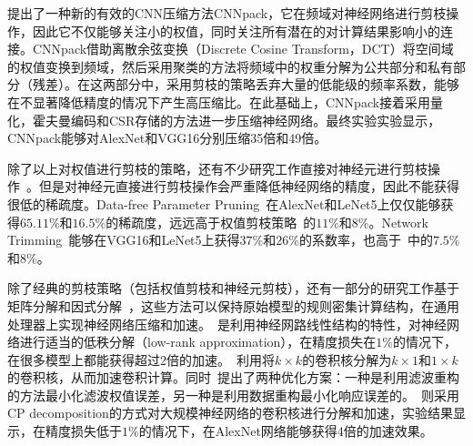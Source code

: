 \citet{wang2016cnnpack}提出了一种新的有效的CNN压缩方法CNNpack，它在频域对神经网络进行剪枝操作，因此它不仅能够关注小的权值，同时关注所有潜在的对计算结果影响小的连接。CNNpack借助离散余弦变换（Discrete Cosine Transform，DCT）将空间域的权值变换到频域，然后采用聚类的方法将频域中的权重分解为公共部分和私有部分（残差）。在这两部分中，采用剪枝的策略丢弃大量的低能级的频率系数，能够在不显著降低精度的情况下产生高压缩比。在此基础上，CNNpack接着采用量化，霍夫曼编码和CSR存储的方法进一步压缩神经网络。最终实验实验显示，CNNpack能够对AlexNet和VGG16分别压缩35倍和49倍。

除了以上对权值进行剪枝的策略，还有不少研究工作直接对神经元进行剪枝操作~\cite{he2014reshaping,srinivas2015data,hu2016network,mariet2015diversity}。但是对神经元直接进行剪枝操作会严重降低神经网络的精度，因此不能获得很低的稀疏度。Data-free Parameter Pruning~\cite{srinivas2015data}在AlexNet和LeNet5上仅仅能够获得$65.11\%$和$16.5\%$的稀疏度，远远高于权值剪枝策略~\cite{han2015learning}的$11\%$和$8\%$。Network Trimming~\cite{hu2016network}能够在VGG16和LeNet5上获得$37\%$和$26\%$的系数率，也高于~\cite{han2015learning}中的$7.5\%$和$8\%$。

除了经典的剪枝策略（包括权值剪枝和神经元剪枝），还有一部分的研究工作基于矩阵分解和因式分解~\cite{denton2014exploiting,jaderberg2014speeding,lebedev2014speeding}，这些方法可以保持原始模型的规则密集计算结构，在通用处理器上实现神经网络压缩和加速。~\citet{denton2014exploiting}是利用神经网路线性结构的特性，对神经网络进行适当的低秩分解（low-rank approximation），在精度损失在$1\%$的情况下，在很多模型上都能获得超过2倍的加速。~\citet{jaderberg2014speeding}利用将$k\times k$的卷积核分解为$k\times 1$和$1\times k$的卷积核，从而加速卷积计算。同时~\cite{jaderberg2014speeding}提出了两种优化方案：一种是利用滤波重构的方法最小化滤波权值误差，另一种是利用数据重构最小化响应误差的。~\citet{lebedev2014speeding}则采用CP decomposition的方式对大规模神经网络的卷积核进行分解和加速，实验结果显示，在精度损失低于$1\%$的情况下，在AlexNet网络能够获得4倍的加速效果。



